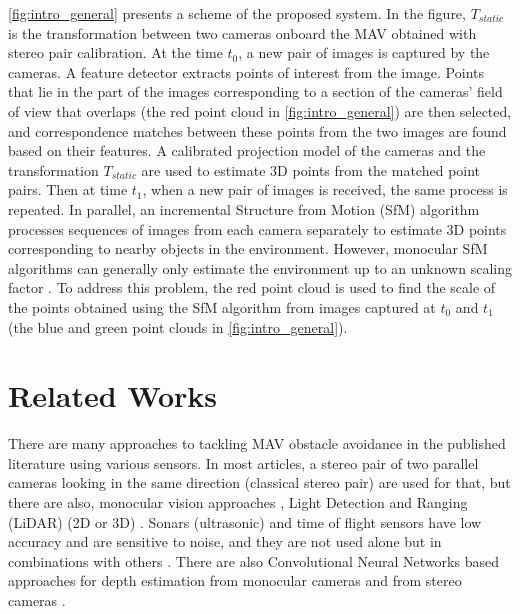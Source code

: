 \autoref{fig:intro_general} presents a scheme of the proposed system.
In the figure, $T_{static}$ is the transformation between two cameras onboard the MAV obtained with stereo pair calibration. 
At the time $t_0$, a new pair of images is captured by the cameras.
A feature detector extracts points of interest from the image.
Points that lie in the part of the images corresponding to a section of the cameras' field of view that overlaps (the red point cloud in \autoref{fig:intro_general}) are then selected, and correspondence matches between these points from the two images are found based on their features.
A calibrated projection model of the cameras and the transformation $T_{static}$ are used to estimate 3D points from the matched point pairs.
Then at time $t_1$, when a new pair of images is received, the same process is repeated. 
In parallel, an incremental Structure from Motion (SfM) algorithm processes sequences of images from each camera separately to estimate 3D points corresponding to nearby objects in the environment. However, monocular SfM algorithms can generally only estimate the environment up to an unknown scaling factor \cite{SfM}. To address this problem, the red point cloud is used to find the scale of the points obtained using the SfM algorithm from images captured at $t_0$ and $t_1$ (the blue and green point clouds in \autoref{fig:intro_general}).

\section{Related Works}

There are many approaches to tackling MAV obstacle avoidance in the published literature using various sensors.
In most articles, a stereo pair of two parallel cameras looking in the same direction (classical stereo pair) \cite{Lin2021,Ruf2018,Oleinikova2015,Back2020} are used for that, but there are also, monocular vision approaches \cite{Mejias2010,Zhang2019,Bills2011}, Light Detection and Ranging (LiDAR) (2D or 3D) \cite{Ramasamy2016}.
Sonars (ultrasonic) and time of flight sensors have low accuracy and are sensitive to noise, and they are not used alone but in combinations with others \cite{Gageik2015,Nor2017}. 
There are also Convolutional Neural Networks based approaches for depth estimation from monocular cameras \cite{Zhang2019,Yu2013, Park2020} and from stereo cameras \cite{Back2020}.


